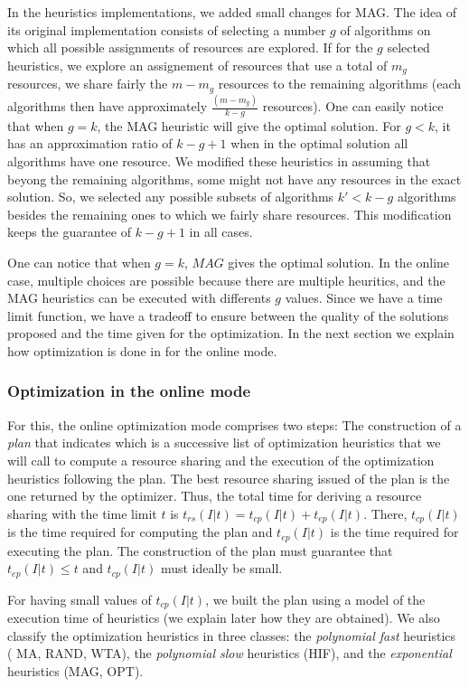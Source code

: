 In the heuristics implementations, we added small changes for MAG. The idea of its original implementation consists 
of selecting a number $g$ of algorithms on which all possible assignments of resources are explored. If for the 
$g$ selected heuristics, we explore an assignement of resources that use a total of $m_g$ resources, we  
share fairly the $m-m_g$ resources to the remaining algorithms (each algorithms then have approximately 
$\frac{(m-m_g)}{k-g}$ resources). One can easily notice that when $g = k$, the MAG heuristic will give the 
optimal solution. For $g < k$, it has an approximation ratio of $k-g+1$ when in the optimal 
solution all algorithms have one resource. We modified these heuristics in assuming that beyong the remaining algorithms, 
some might not have any resources in the exact solution. So, we selected any possible subsets of algorithms $k'< k-g$ 
algorithms besides the remaining ones to which we fairly share resources. This modification keeps the 
guarantee of $k-g+1$ in all cases. 

One can notice that when $g = k$, $MAG$ gives the optimal solution. In the online case,  
multiple choices are possible because there are multiple heuritics, and the MAG heuristics can be executed 
with differents $g$ values. Since we have a time limit function, we have a tradeoff to ensure between the 
quality of the solutions proposed and the time given for the optimization. In the next 
section we explain how optimization is done in for the online mode.

\subsubsection{Optimization in the online mode}

For this, the online optimization mode comprises two steps: The construction of a \textit{plan} that indicates 
which is a successive list of optimization heuristics that we will call to compute a resource sharing  
and the execution of the optimization heuristics following the plan. The best resource sharing issued of 
the plan is the one returned by the optimizer. Thus, the total time for deriving a resource sharing with the 
time limit $t$ is $t_{rs}(I|t) = t_{cp}(I|t) + t_{ep}(I|t)$. There, $ t_{cp}(I|t)$ is the time required 
for computing the plan and $t_{ep}(I|t)$ is the time required for executing the plan. The construction of 
the plan must guarantee that $t_{ep}(I|t) \leq t$ and $t_{cp}(I|t)$ must ideally be small.

For having small values of $t_{cp}(I|t)$,  we built the plan using a model of  
the execution time of heuristics (we explain later how they are obtained). We also classify the optimization heuristics 
in three classes: the \textit{polynomial fast} heuristics ( MA, RAND, WTA), the \textit{polynomial slow} heuristics (HIF), and 
the \textit{exponential} heuristics (MAG, OPT). 

